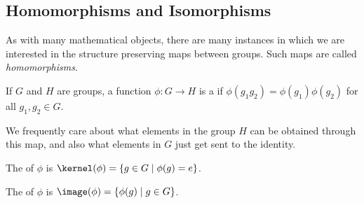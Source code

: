 



\subsection{Homomorphisms and Isomorphisms}

As with many mathematical objects, there are many instances in which we are interested in the structure preserving maps between groups. Such maps are called 
\emph{homomorphisms}.

\begin{definition}[Homomorphism]
  If $G$ and $H$ are groups, a function $\phi: G \rightarrow H$ is a  if
  $
  \phi(g_1 g_2) = \phi(g_1) \phi(g_2)
  $
  for all $g_1, g_2 \in G$.
\end{definition}

We frequently care about what elements in the group $H$ can be obtained through this map, and also what elements in $G$ just get sent to the identity. 

\begin{definition}[Kernel]
	The  of $\phi$ is $\kernel(\phi) = \{ g \in G \mid \phi(g) = e\}$.
\end{definition}
\begin{definition}[Image]
	The  of $\phi$ is $\image(\phi) = \{ \phi(g) \mid g \in G\}$. 
\end{definition}

